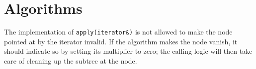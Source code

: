 \section{Algorithms}

The implementation of \verb|apply(iterator&)| is not allowed to make the node
pointed at by the iterator invalid. If the algorithm makes the node
vanish, it should indicate so by setting its multiplier to zero; the
calling logic will then take care of cleaning up the subtree at the
node.
